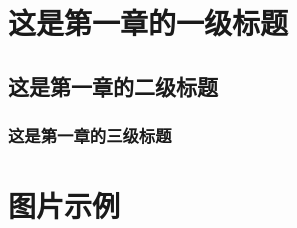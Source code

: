 
\begin{abstract}
	这是摘要的第一段这是摘要的第一段这是摘要的第一段这是摘要的第一段这是摘要的第一段这是摘要的第一段这是摘要的第一段这是摘要的第一段这是摘要的第一段这是摘要的第一段这是摘要的第一段这是摘要的第一段这是摘要的第一段这是摘要的第一段这是摘要的第一段这是摘要的第一段这是摘要的第一段这是摘要的第一段这是摘要的第一段这是摘要的第一段这是摘要的第一段这是摘要的第一段这是摘要的第一段这是摘要的第一段这是摘要的第一段这是摘要的第一段这是摘要的第一段这是摘要的第一段这是摘要的第一段这是摘要的第一段这是摘要的第一段这是摘要的第一段这是摘要的第一段这是摘要的第一段这是摘要的第一段这是摘要的第一段
	
	这是摘要的第二段这是摘要的第二段这是摘要的第二段这是摘要的第二段这是摘要的第二段这是摘要的第二段这是摘要的第二段这是摘要的第二段这是摘要的第二段这是摘要的第二段这是摘要的第二段这是摘要的第二段这是摘要的第二段这是摘要的第二段这是摘要的第二段这是摘要的第二段这是摘要的第二段这是摘要的第二段这是摘要的第二段这是摘要的第二段这是摘要的第二段这是摘要的第二段这是摘要的第二段这是摘要的第二段这是摘要的第二段这是摘要的第二段这是摘要的第二段这是摘要的第二段这是摘要的第二段这是摘要的第二段这是摘要的第二段这是摘要的第二段这是摘要的第二段这是摘要的第二段这是摘要的第二段这是摘要的第二段这是摘要的第二段这是摘要的第二段这是摘要的第二段这是摘要的第二段这是摘要的第二段这是摘要的第二段这是摘要的第二段这是摘要的第二段这是摘要的第二段这是摘要的第二段
	
	
	超链接:
	
	\url{https://baidu.com}
	
	\href{https://bing.com}{必应官网}
	
	\textbf{\color{blue}关键字:\quad 关键字1 \quad 关键字2 \quad 关键字3}
	
\end{abstract}


\newpage

\section{这是第一章的一级标题}
\subsection{这是第一章的二级标题}
\subsubsection{这是第一章的三级标题}

\newpage

\section{图片示例}
